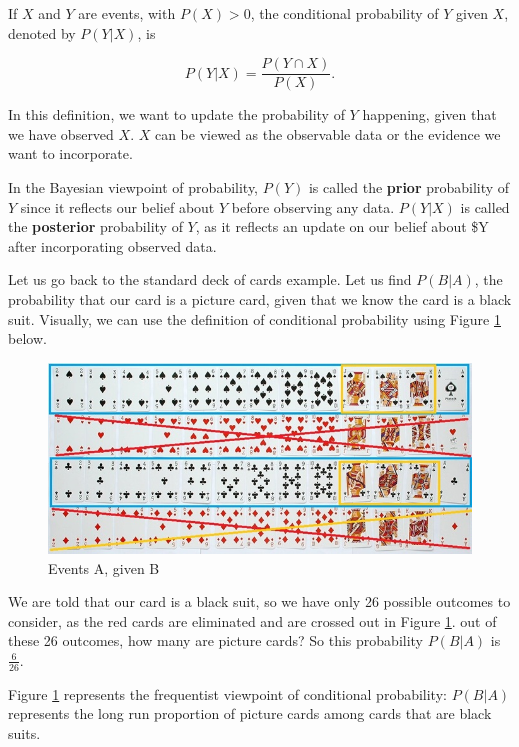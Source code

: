 \documentclass[
]{book}
\begin{document}
If \(X\) and \(Y\) are events, with \(P(X)>0\), the conditional probability of \(Y\) given \(X\), denoted by \(P(Y|X)\), is

\begin{equation} 
P(Y|X) = \frac{P(Y \cap X)}{P(X)}.
\label{eq:cond}
\end{equation}

In this definition, we want to update the probability of \(Y\) happening, given that we have observed \(X\). \(X\) can be viewed as the observable data or the evidence we want to incorporate.

In the Bayesian viewpoint of probability, \(P(Y)\) is called the \textbf{prior} probability of \(Y\) since it reflects our belief about \(Y\) before observing any data. \(P(Y|X)\) is called the \textbf{posterior} probability of \(Y\), as it reflects an update on our belief about \$Y after incorporating observed data.

Let us go back to the standard deck of cards example. Let us find \(P(B|A)\), the probability that our card is a picture card, given that we know the card is a black suit. Visually, we can use the definition of conditional probability using Figure \ref{fig:cardscond} below.

\begin{figure}
\centering
\includegraphics{images/02-cardscond.jpg}
\caption{\label{fig:cardscond}Events A, given B}
\end{figure}

We are told that our card is a black suit, so we have only 26 possible outcomes to consider, as the red cards are eliminated and are crossed out in Figure \ref{fig:cardscond}. out of these 26 outcomes, how many are picture cards? So this probability \(P(B|A)\) is \(\frac{6}{26}\).

Figure \ref{fig:cardscond} represents the frequentist viewpoint of conditional probability: \(P(B|A)\) represents the long run proportion of picture cards among cards that are black suits.
\end{document}
